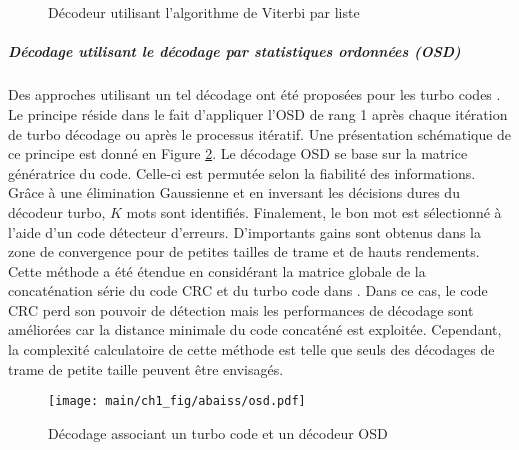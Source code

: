 \begin{figure}[tb]
  \begin{center}
    \\[1.5em] 
    \\[1.5em] 
    \caption{Décodeur utilisant l’algorithme de Viterbi par liste}
    \label{fig:lva}
  \end{center}
\end{figure}

\subparagraph{Décodage utilisant le décodage par statistiques ordonnées (OSD)} Des approches utilisant un tel décodage 
ont été proposées pour les turbo codes \cite{osdAided}. Le principe réside dans le fait d'appliquer l'OSD \cite{osd} de 
rang 1 après chaque itération de turbo décodage ou après le processus itératif. Une présentation schématique de ce 
principe est donné en Figure \ref{fig:osd}. Le décodage OSD se base sur la matrice génératrice du code. Celle-ci est 
permutée selon la fiabilité des informations. Grâce à une élimination Gaussienne et en inversant les décisions dures du 
décodeur turbo, $K$ mots sont identifiés. Finalement, le bon mot est sélectionné à l'aide d'un code détecteur d'erreurs. 
D'importants gains sont obtenus dans la zone de convergence pour de petites tailles de trame et de hauts rendements.  
Cette méthode a été étendue en considérant la matrice globale de la concaténation série du code CRC et du turbo code dans 
\cite{osdCrcAided}. Dans ce cas, le code CRC perd son pouvoir de détection mais les performances de décodage sont améliorées 
car la distance minimale du code concaténé est exploitée. Cependant, la complexité calculatoire de cette méthode est telle
que seuls des décodages de trame de petite taille peuvent être envisagés.

\begin{figure}[tb]
\begin{center}
	\texttt{[image: main/ch1\_fig/abaiss/osd.pdf]}
	\end{center}
	\caption{Décodage associant un turbo code et un décodeur OSD \label{fig:osd}}
\end{figure}

